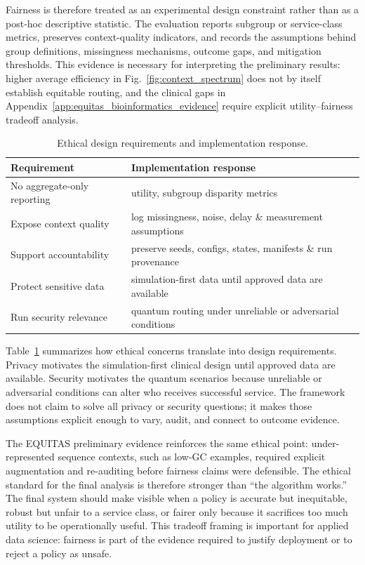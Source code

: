\documentclass[conference]{IEEEtran}
\begin{document}
Fairness is therefore treated as an experimental design constraint rather than
as a post-hoc descriptive statistic. The evaluation reports subgroup or
service-class metrics, preserves context-quality indicators, and records the
assumptions behind group definitions, missingness mechanisms, outcome gaps,
and mitigation thresholds. This evidence is necessary for interpreting the
preliminary results: higher average efficiency in Fig.~\ref{fig:context_spectrum}
does not by itself establish equitable routing, and the clinical gaps in
Appendix~\ref{app:equitas_bioinformatics_evidence} require explicit
utility--fairness tradeoff analysis.

\begin{table}[t]
\caption{Ethical design requirements and implementation response.}
\label{tab:ethics}
\centering
\small
\begin{tabular}{p{}p{}}
\toprule
\textbf{Requirement} & \textbf{Implementation response} \\
\midrule
No aggregate-only reporting & utility, subgroup disparity metrics \\
Expose context quality & log missingness, noise, delay \& measurement assumptions \\
Support accountability & preserve seeds, configs, states, manifests \& run provenance \\
Protect sensitive data & simulation-first data until approved data are available \\
Run security relevance & quantum routing under unreliable or adversarial conditions \\
\bottomrule
\end{tabular}
\end{table}

Table~\ref{tab:ethics} summarizes how ethical concerns translate into design
requirements. Privacy motivates the simulation-first clinical design until
approved data are available. Security motivates the quantum scenarios because
unreliable or adversarial conditions can alter who receives successful
service. The framework does not claim to solve all privacy or security
questions; it makes those assumptions explicit enough to vary, audit, and
connect to outcome evidence.

The EQUITAS preliminary evidence reinforces the same ethical point:
under-represented sequence contexts, such as low-GC examples, required explicit
augmentation and re-auditing before fairness claims were defensible. The ethical
standard for the final analysis is therefore stronger than ``the algorithm works.''
The final system should make visible when a policy is accurate but inequitable,
robust but unfair to a service class, or fairer only because it sacrifices too
much utility to be operationally useful. This tradeoff framing is important for
applied data science: fairness is part of the evidence required to justify
deployment or to reject a policy as unsafe.
\end{document}
